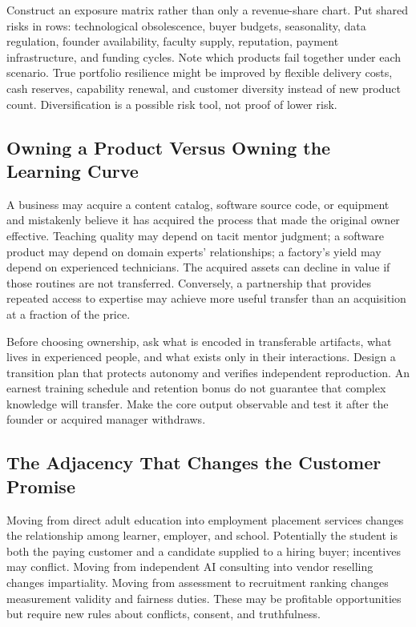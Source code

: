 Construct an exposure matrix rather than only a revenue-share chart. Put shared risks in rows: technological obsolescence, buyer budgets, seasonality, data regulation, founder availability, faculty supply, reputation, payment infrastructure, and funding cycles. Note which products fail together under each scenario. True portfolio resilience might be improved by flexible delivery costs, cash reserves, capability renewal, and customer diversity instead of new product count. Diversification is a possible risk tool, not proof of lower risk.

\subsection{Owning a Product Versus Owning the Learning Curve}
\label{sec:owning_product_vs_learning_curve}

A business may acquire a content catalog, software source code, or equipment and mistakenly believe it has acquired the process that made the original owner effective. Teaching quality may depend on tacit mentor judgment; a software product may depend on domain experts' relationships; a factory's yield may depend on experienced technicians. The acquired assets can decline in value if those routines are not transferred. Conversely, a partnership that provides repeated access to expertise may achieve more useful transfer than an acquisition at a fraction of the price.

Before choosing ownership, ask what is encoded in transferable artifacts, what lives in experienced people, and what exists only in their interactions. Design a transition plan that protects autonomy and verifies independent reproduction. An earnest training schedule and retention bonus do not guarantee that complex knowledge will transfer. Make the core output observable and test it after the founder or acquired manager withdraws.

\subsection{The Adjacency That Changes the Customer Promise}
\label{sec:adjacency_changes_customer_promise}

Moving from direct adult education into employment placement services changes the relationship among learner, employer, and school. Potentially the student is both the paying customer and a candidate supplied to a hiring buyer; incentives may conflict. Moving from independent AI consulting into vendor reselling changes impartiality. Moving from assessment to recruitment ranking changes measurement validity and fairness duties. These may be profitable opportunities but require new rules about conflicts, consent, and truthfulness.

